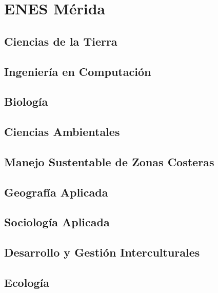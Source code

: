 \section{ENES Mérida}

\subsection{Ciencias de la Tierra}

\subsection{Ingeniería en Computación}

\subsection{Biología}

\subsection{Ciencias Ambientales}

\subsection{Manejo Sustentable de Zonas Costeras}

\subsection{Geografía Aplicada}

\subsection{Sociología Aplicada}

\subsection{Desarrollo y Gestión Interculturales}

\subsection{Ecología}
